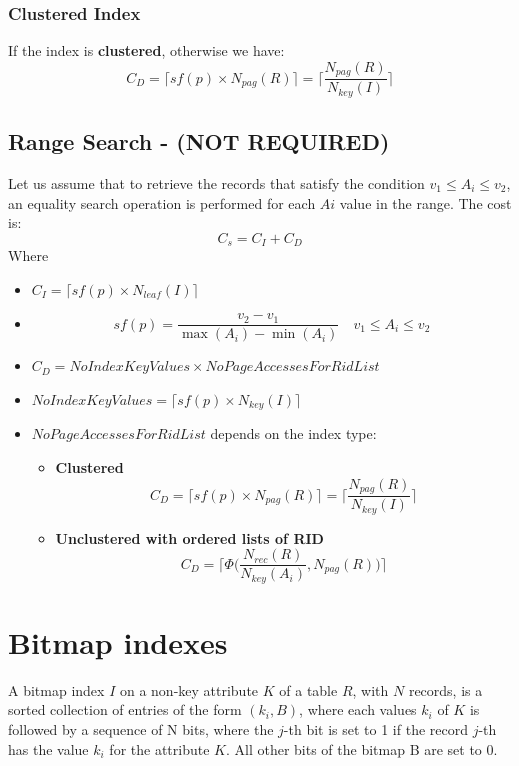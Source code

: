 \subsubsection{Clustered Index}
If the index is \textbf{clustered}, otherwise we have:
\[C_D = \lceil sf(p) \times N_{pag}(R)\rceil = \Bigg\lceil \frac{N_{pag}(R)}{N_{key}(I)} \Bigg\rceil\]


\subsection{Range Search - (NOT REQUIRED)}
Let us assume that to retrieve the records that satisfy the condition \(v_1 \leq A_i \leq v_2\), an equality search operation is performed for each \(Ai\) value in the range. The cost is:
\[C_s = C_I + C_D\]
Where
\begin{itemize}
    \item \(C_I = \lceil sf(p) \times N_{leaf}(I) \rceil\)
    \item \[sf(p) = \frac{v_2 - v_1}{\max(A_i) - \min(A_i)} \quad v_1 \leq A_i \leq v_2\]
    \item \(C_D = NoIndexKeyValues \times NoPageAccessesForRidList\)
    \item \(NoIndexKeyValues = \lceil sf(p) \times N_{key}(I) \rceil\)
    \item \(NoPageAccessesForRidList\) depends on the index type:
    \begin{itemize}
        \item \textbf{Clustered} \[C_D = \lceil sf(p) \times N_{pag}(R)\rceil = \Bigg\lceil \frac{N_{pag}(R)}{N_{key}(I)} \Bigg\rceil\]
        \item \textbf{Unclustered with ordered lists of RID} \[C_D = \Bigg\lceil \Phi\Bigg( \frac{N_{rec}(R)}{N_{key}(A_i)}, N_{pag}(R) \Bigg) \Bigg\rceil\]
    \end{itemize}
\end{itemize}

\section{Bitmap indexes}
\begin{tcolorbox}
A bitmap index \(I\) on a non-key attribute \(K\) of a table \(R\), with \(N\) records, is a sorted collection of entries of the form \((k_i, B)\), where each values \(k_i\) of \(K\) is followed by a sequence of N bits, where the \(j\)-th bit is set to 1 if the record \(j\)-th has the value \(k_i\) for the attribute \(K\). All other bits of the bitmap B are set to 0.
\end{tcolorbox}

